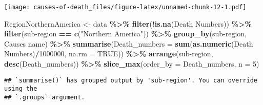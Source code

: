\documentclass[
]{article}
\newenvironment{Shaded}{\begin{snugshade}}{\end{snugshade}}
\newcommand{\AttributeTok}[1]{\textcolor[rgb]{0.13,0.29,0.53}{#1}}
\newcommand{\ConstantTok}[1]{\textcolor[rgb]{0.56,0.35,0.01}{#1}}
\newcommand{\DecValTok}[1]{\textcolor[rgb]{0.00,0.00,0.81}{#1}}
\newcommand{\FunctionTok}[1]{\textcolor[rgb]{0.13,0.29,0.53}{\textbf{#1}}}
\newcommand{\NormalTok}[1]{#1}
\newcommand{\OtherTok}[1]{\textcolor[rgb]{0.56,0.35,0.01}{#1}}
\newcommand{\SpecialCharTok}[1]{\textcolor[rgb]{0.81,0.36,0.00}{\textbf{#1}}}
\newcommand{\StringTok}[1]{\textcolor[rgb]{0.31,0.60,0.02}{#1}}
\begin{document}
\texttt{[image: causes-of-death\_files/figure-latex/unnamed-chunk-12-1.pdf]}

\begin{Shaded}
\begin{Highlighting}[]
\NormalTok{RegionNorthernAmerica }\OtherTok{\textless{}{-}}\NormalTok{ data }\SpecialCharTok{\%\textgreater{}\%}
  \FunctionTok{filter}\NormalTok{(}\SpecialCharTok{!}\FunctionTok{is.na}\NormalTok{(}\StringTok{\textasciigrave{}}\AttributeTok{Death Numbers}\StringTok{\textasciigrave{}}\NormalTok{)) }\SpecialCharTok{\%\textgreater{}\%}
  \FunctionTok{filter}\NormalTok{(}\StringTok{\textasciigrave{}}\AttributeTok{sub{-}region}\StringTok{\textasciigrave{}} \SpecialCharTok{==} \FunctionTok{c}\NormalTok{(}\StringTok{"Northern America"}\NormalTok{)) }\SpecialCharTok{\%\textgreater{}\%}
  \FunctionTok{group\_by}\NormalTok{(}\StringTok{\textasciigrave{}}\AttributeTok{sub{-}region}\StringTok{\textasciigrave{}}\NormalTok{, }\StringTok{\textasciigrave{}}\AttributeTok{Causes name}\StringTok{\textasciigrave{}}\NormalTok{) }\SpecialCharTok{\%\textgreater{}\%}
  \FunctionTok{summarise}\NormalTok{(}\AttributeTok{Death\_numbers =} \FunctionTok{sum}\NormalTok{(}\FunctionTok{as.numeric}\NormalTok{(}\StringTok{\textasciigrave{}}\AttributeTok{Death Numbers}\StringTok{\textasciigrave{}}\NormalTok{)}\SpecialCharTok{/}\DecValTok{1000000}\NormalTok{, }\AttributeTok{na.rm =} \ConstantTok{TRUE}\NormalTok{)) }\SpecialCharTok{\%\textgreater{}\%}
  \FunctionTok{arrange}\NormalTok{(}\StringTok{\textasciigrave{}}\AttributeTok{sub{-}region}\StringTok{\textasciigrave{}}\NormalTok{, }\FunctionTok{desc}\NormalTok{(Death\_numbers)) }\SpecialCharTok{\%\textgreater{}\%}
  \FunctionTok{slice\_max}\NormalTok{(}\AttributeTok{order\_by =}\NormalTok{ Death\_numbers, }\AttributeTok{n =} \DecValTok{5}\NormalTok{)}
\end{Highlighting}
\end{Shaded}

\begin{verbatim}
## `summarise()` has grouped output by 'sub-region'. You can override using the
## `.groups` argument.
\end{verbatim}
\end{document}
